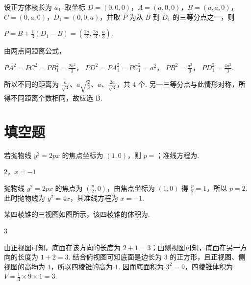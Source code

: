 \begin{solution}
设正方体棱长为 \(a\)，取坐标
\(D=(0,0,0)\)，\(A=(a,0,0)\)，\(B=(a,a,0)\)，\(C=(0,a,0)\)，\(D_1=(0,0,a)\)，并取 \(P\) 为从 \(B\) 到 \(D_1\) 的三等分点之一，则

\(P=B+\frac{1}{3}(D_1-B)=\left(\frac{2a}{3},\frac{2a}{3},\frac{a}{3}\right)\).

由两点间距离公式，

\(PA^2=PC^2=PB_1^2=\frac{2a^2}{3}\)，
\(PD^2=PA_1^2=PC_1^2=a^2\)，
\(PB^2=\frac{a^2}{3}\)，
\(PD_1^2=\frac{4a^2}{3}\).

所以不同的距离为 \(\frac{a}{\sqrt{3}}\)、\(a\sqrt{\frac{2}{3}}\)、\(a\)、\(\frac{2a}{\sqrt{3}}\)，共 \(4\) 个. 另一三等分点与此情形对称，所得不同距离个数相同，故应选 B.
\end{solution}

\section{填空题}

\begin{problem}
若抛物线 \( y^{2}=2px \) 的焦点坐标为 \( (1,0) \)，则 \(p=\)\fillinblank{}；准线方程为\fillinblank{}.
\end{problem}

\begin{answer}
\(2\)，\(x=-1\)
\end{answer}

\begin{solution}
抛物线 \(y^2=2px\) 的焦点为 \(\left(\frac{p}{2},0\right)\)，由焦点坐标为 \((1,0)\) 得 \(\frac{p}{2}=1\)，所以 \(p=2\). 此时抛物线为 \(y^2=4x\)，其准线方程为 \(x=-1\).
\end{solution}

\begin{problem}
某四棱锥的三视图如图所示，该四棱锥的体积为\fillinblank{}.

\end{problem}

\begin{answer}
\(3\)
\end{answer}

\begin{solution}
由正视图可知，底面在该方向的长度为 \(2+1=3\)；由侧视图可知，底面在另一方向的长度为 \(1+2=3\). 结合俯视图可知底面是边长为 \(3\) 的正方形，且正视图、侧视图的高均为 \(1\)，所以四棱锥的高为 \(1\). 因而底面积为 \(3^2=9\)，四棱锥体积为 \(V=\frac{1}{3}\times9\times1=3\).
\end{solution}

